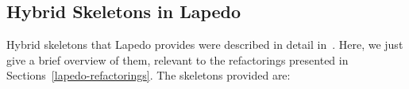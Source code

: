\documentclass[final]{jfp1}
\newcommand{\lapedo}{\xspace{\sc Lapedo}\xspace}
\newcommand{\Lapedo}{\lapedo}
\begin{document}



\subsection{Hybrid Skeletons in Lapedo}
\label{sec:hybridSkeletons}

Hybrid skeletons that Lapedo provides were described in detail in~\cite{parco2015}. Here, we just give a brief overview of them, relevant to the refactorings presented in Sections~\ref{lapedo-refactorings}. The skeletons provided are:
\end{document}
